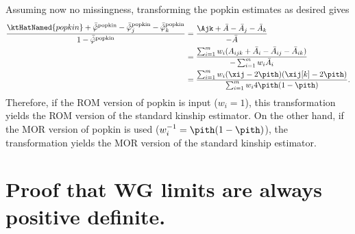 \documentclass[11pt]{article}
\begin{document}
\begin{appendices}
  Assuming now no missingness, transforming the popkin estimates as desired gives
  \begin{align*}
    \frac{
    \ktHatNamed{popkin}
    + \bar{ \hat{ \varphi } }^\text{popkin}
    - \bar{ \hat{ \varphi } }_j^\text{popkin}
    - \bar{ \hat{ \varphi } }_k^\text{popkin}
    }{
    1 - \bar{ \hat{ \varphi } }^\text{popkin}
    }
    &=
      \frac{
      \Ajk
      + \bar{A}
      - \bar{A}_j
      - \bar{A}_k
      }{
      - \bar{A}
      }
    \\
    &=
      \frac{
      \sum_{i=1}^m w_i ( A_{ijk} + \bar{A}_i - \bar{A}_{ij} - \bar{A}_{ik} )
      }{
      - \sum_{i=1}^m w_i \bar{A}_i
      }
    \\
    &=
      \frac{
      \sum_{i=1}^m w_i (\xij - 2 \pith) (\xij[k] - 2 \pith )
      }{
      \sum_{i=1}^m w_i 4 \pith ( 1 - \pith )
      }
      .
  \end{align*}
  Therefore, if the ROM version of popkin is input ($w_i=1$), this transformation yields the ROM version of the standard kinship estimator.
  On the other hand, if the MOR version of popkin is used ($w_i^{-1} = \pith ( 1 - \pith )$), the transformation yields the MOR version of the standard kinship estimator.
  
  \section{Proof that WG limits are always positive definite.}

  \label{sec:wg_posdef}


\end{appendices}
\end{document}
